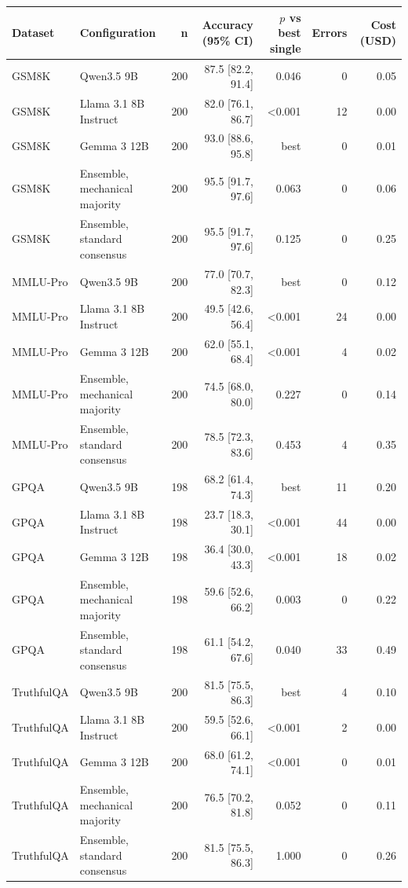 \begin{tabular}{llrrrrr}
\toprule
Dataset & Configuration & n & Accuracy (95\% CI) & $p$ vs best single & Errors & Cost (USD) \\
\midrule
GSM8K & Qwen3.5 9B & 200 & 87.5 [82.2, 91.4] & 0.046 & 0 & 0.05 \\
GSM8K & Llama 3.1 8B Instruct & 200 & 82.0 [76.1, 86.7] & <0.001 & 12 & 0.00 \\
GSM8K & Gemma 3 12B & 200 & 93.0 [88.6, 95.8] & best & 0 & 0.01 \\
GSM8K & Ensemble, mechanical majority & 200 & 95.5 [91.7, 97.6] & 0.063 & 0 & 0.06 \\
GSM8K & Ensemble, standard consensus & 200 & 95.5 [91.7, 97.6] & 0.125 & 0 & 0.25 \\
\midrule
MMLU-Pro & Qwen3.5 9B & 200 & 77.0 [70.7, 82.3] & best & 0 & 0.12 \\
MMLU-Pro & Llama 3.1 8B Instruct & 200 & 49.5 [42.6, 56.4] & <0.001 & 24 & 0.00 \\
MMLU-Pro & Gemma 3 12B & 200 & 62.0 [55.1, 68.4] & <0.001 & 4 & 0.02 \\
MMLU-Pro & Ensemble, mechanical majority & 200 & 74.5 [68.0, 80.0] & 0.227 & 0 & 0.14 \\
MMLU-Pro & Ensemble, standard consensus & 200 & 78.5 [72.3, 83.6] & 0.453 & 4 & 0.35 \\
\midrule
GPQA & Qwen3.5 9B & 198 & 68.2 [61.4, 74.3] & best & 11 & 0.20 \\
GPQA & Llama 3.1 8B Instruct & 198 & 23.7 [18.3, 30.1] & <0.001 & 44 & 0.00 \\
GPQA & Gemma 3 12B & 198 & 36.4 [30.0, 43.3] & <0.001 & 18 & 0.02 \\
GPQA & Ensemble, mechanical majority & 198 & 59.6 [52.6, 66.2] & 0.003 & 0 & 0.22 \\
GPQA & Ensemble, standard consensus & 198 & 61.1 [54.2, 67.6] & 0.040 & 33 & 0.49 \\
\midrule
TruthfulQA & Qwen3.5 9B & 200 & 81.5 [75.5, 86.3] & best & 4 & 0.10 \\
TruthfulQA & Llama 3.1 8B Instruct & 200 & 59.5 [52.6, 66.1] & <0.001 & 2 & 0.00 \\
TruthfulQA & Gemma 3 12B & 200 & 68.0 [61.2, 74.1] & <0.001 & 0 & 0.01 \\
TruthfulQA & Ensemble, mechanical majority & 200 & 76.5 [70.2, 81.8] & 0.052 & 0 & 0.11 \\
TruthfulQA & Ensemble, standard consensus & 200 & 81.5 [75.5, 86.3] & 1.000 & 0 & 0.26 \\
\bottomrule
\end{tabular}
